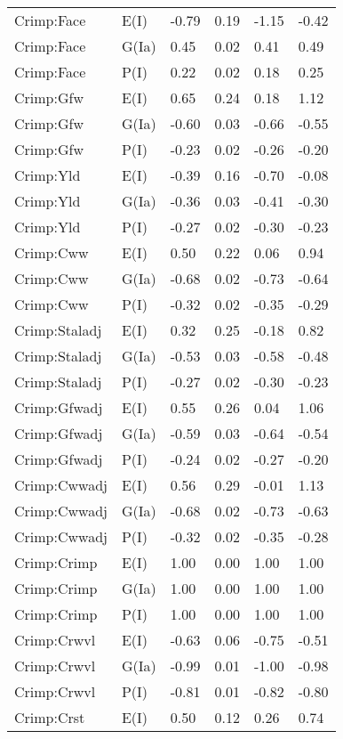 \begin{center}
\begin{longtable}{|p{1.1in}|p{0.7in}|p{0.7in}|p{0.6in}|p{0.6in}|p{0.6in}|}
  Crimp:Face & E(I) & -0.79 & 0.19 & -1.15 & -0.42 \\ 
  Crimp:Face & G(Ia) & 0.45 & 0.02 & 0.41 & 0.49 \\ 
  Crimp:Face & P(I) & 0.22 & 0.02 & 0.18 & 0.25 \\ 
  Crimp:Gfw & E(I) & 0.65 & 0.24 & 0.18 & 1.12 \\ 
  Crimp:Gfw & G(Ia) & -0.60 & 0.03 & -0.66 & -0.55 \\ 
  Crimp:Gfw & P(I) & -0.23 & 0.02 & -0.26 & -0.20 \\ 
  Crimp:Yld & E(I) & -0.39 & 0.16 & -0.70 & -0.08 \\ 
  Crimp:Yld & G(Ia) & -0.36 & 0.03 & -0.41 & -0.30 \\ 
  Crimp:Yld & P(I) & -0.27 & 0.02 & -0.30 & -0.23 \\ 
  Crimp:Cww & E(I) & 0.50 & 0.22 & 0.06 & 0.94 \\ 
  Crimp:Cww & G(Ia) & -0.68 & 0.02 & -0.73 & -0.64 \\ 
  Crimp:Cww & P(I) & -0.32 & 0.02 & -0.35 & -0.29 \\ 
  Crimp:Staladj & E(I) & 0.32 & 0.25 & -0.18 & 0.82 \\ 
  Crimp:Staladj & G(Ia) & -0.53 & 0.03 & -0.58 & -0.48 \\ 
  Crimp:Staladj & P(I) & -0.27 & 0.02 & -0.30 & -0.23 \\ 
  Crimp:Gfwadj & E(I) & 0.55 & 0.26 & 0.04 & 1.06 \\ 
  Crimp:Gfwadj & G(Ia) & -0.59 & 0.03 & -0.64 & -0.54 \\ 
  Crimp:Gfwadj & P(I) & -0.24 & 0.02 & -0.27 & -0.20 \\ 
  Crimp:Cwwadj & E(I) & 0.56 & 0.29 & -0.01 & 1.13 \\ 
  Crimp:Cwwadj & G(Ia) & -0.68 & 0.02 & -0.73 & -0.63 \\ 
  Crimp:Cwwadj & P(I) & -0.32 & 0.02 & -0.35 & -0.28 \\ 
  Crimp:Crimp & E(I) & 1.00 & 0.00 & 1.00 & 1.00 \\ 
  Crimp:Crimp & G(Ia) & 1.00 & 0.00 & 1.00 & 1.00 \\ 
  Crimp:Crimp & P(I) & 1.00 & 0.00 & 1.00 & 1.00 \\ 
  Crimp:Crwvl & E(I) & -0.63 & 0.06 & -0.75 & -0.51 \\ 
  Crimp:Crwvl & G(Ia) & -0.99 & 0.01 & -1.00 & -0.98 \\ 
  Crimp:Crwvl & P(I) & -0.81 & 0.01 & -0.82 & -0.80 \\ 
  Crimp:Crst & E(I) & 0.50 & 0.12 & 0.26 & 0.74 \\ 

\end{longtable}
\end{center}
